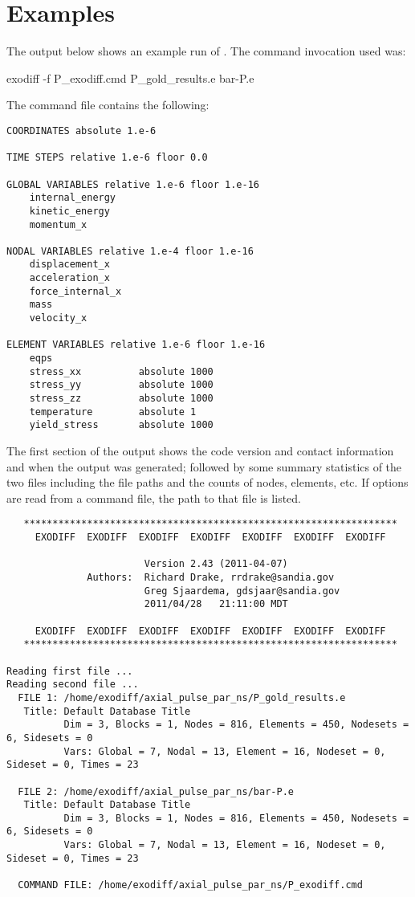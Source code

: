 \section{Examples}
The output below shows an example run of \exodiff{}.  The command
invocation used was:
\begin{syntax}
exodiff -f P_exodiff.cmd P_gold_results.e bar-P.e
\end{syntax}

The  command file contains the following:
\begin{verbatim}
COORDINATES absolute 1.e-6

TIME STEPS relative 1.e-6 floor 0.0

GLOBAL VARIABLES relative 1.e-6 floor 1.e-16
	internal_energy
	kinetic_energy
	momentum_x

NODAL VARIABLES relative 1.e-4 floor 1.e-16
	displacement_x
	acceleration_x
	force_internal_x
	mass
	velocity_x

ELEMENT VARIABLES relative 1.e-6 floor 1.e-16
	eqps
	stress_xx          absolute 1000
	stress_yy          absolute 1000
	stress_zz          absolute 1000
	temperature        absolute 1
	yield_stress       absolute 1000
\end{verbatim}

The first section of the output shows the code version and contact
information and when the output was generated; followed by some
summary statistics of the two files including the file paths and the
counts of nodes, elements, etc.  If options are read from a command
file, the path to that file is listed.

\begin{verbatim}
   *****************************************************************
     EXODIFF  EXODIFF  EXODIFF  EXODIFF  EXODIFF  EXODIFF  EXODIFF

                        Version 2.43 (2011-04-07)
              Authors:  Richard Drake, rrdrake@sandia.gov
                        Greg Sjaardema, gdsjaar@sandia.gov
                        2011/04/28   21:11:00 MDT

     EXODIFF  EXODIFF  EXODIFF  EXODIFF  EXODIFF  EXODIFF  EXODIFF
   *****************************************************************

Reading first file ...
Reading second file ...
  FILE 1: /home/exodiff/axial_pulse_par_ns/P_gold_results.e
   Title: Default Database Title
          Dim = 3, Blocks = 1, Nodes = 816, Elements = 450, Nodesets = 6, Sidesets = 0
          Vars: Global = 7, Nodal = 13, Element = 16, Nodeset = 0, Sideset = 0, Times = 23

  FILE 2: /home/exodiff/axial_pulse_par_ns/bar-P.e
   Title: Default Database Title
          Dim = 3, Blocks = 1, Nodes = 816, Elements = 450, Nodesets = 6, Sidesets = 0
          Vars: Global = 7, Nodal = 13, Element = 16, Nodeset = 0, Sideset = 0, Times = 23

  COMMAND FILE: /home/exodiff/axial_pulse_par_ns/P_exodiff.cmd
\end{verbatim}

